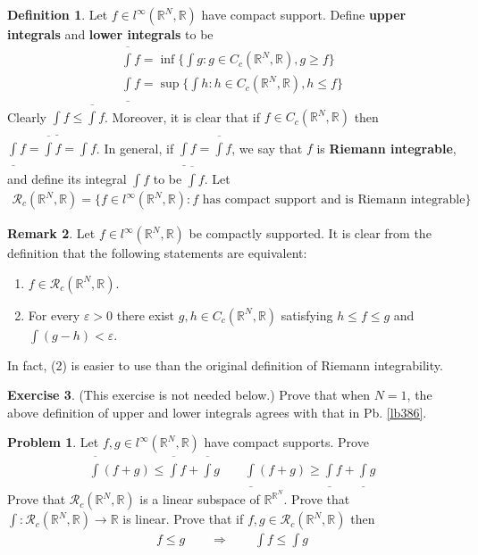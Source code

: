 \documentclass[12pt,b5paper,notitlepage]{article}
\theoremstyle{definition}
\newtheorem{df}{Definition}[section]
\newtheorem{exe}[df]{Exercise}
\newtheorem{rem}[df]{Remark}
\newtheorem{prob}{\color{red}Problem}[section]
\theoremstyle{plain}
\newcommand{\ovl}{\overline}
\newcommand{\udl}{\underline}
\newcommand{\scr}{\mathscr}
\newcommand{\Rbb}{\mathbb R}
\newcommand{\eps}{\varepsilon}
\numberwithin{equation}{section}
\begin{document}
\begin{df}
Let $f\in l^\infty(\Rbb^N,\Rbb)$ have compact support. Define \textbf{upper integrals} and \textbf{lower integrals} to be
\begin{gather*}
\ovl\int f=\inf\Big\{\int g:g\in C_c(\Rbb^N,\Rbb),g\geq f  \Big\}\\
\underline\int f=\sup\Big\{\int h:h\in C_c(\Rbb^N,\Rbb),h\leq f  \Big\}
\end{gather*}
Clearly $\udl\int f\leq\ovl\int f$. Moreover, it is clear that if $f\in C_c(\Rbb^N,\Rbb)$ then $\udl\int f=\ovl\int f=\int f$. In general, if $\udl\int f=\ovl\int f$, we say that $f$ is \textbf{Riemann integrable},  and define its integral $\int f$ to be $\ovl\int f$. Let \index{Rc@$\scr R_c(\Rbb^N,\Rbb)$}
\begin{align*}
\scr R_c(\Rbb^N,\Rbb)=\{f\in l^\infty(\Rbb^N,\Rbb):f\text{ has compact support and is Riemann integrable}\}
\end{align*}
\end{df}

\begin{rem}\label{lb489}
Let $f\in l^\infty(\Rbb^N,\Rbb)$ be compactly supported. It is clear from the definition that the following statements are equivalent:
\begin{enumerate}[label=(\arabic*)]
\item $f\in\scr R_c(\Rbb^N,\Rbb)$.
\item For every $\eps>0$ there exist $g,h\in C_c(\Rbb^N,\Rbb)$ satisfying $h\leq f\leq g$ and $\int(g-h)<\eps$.
\end{enumerate}
In fact, (2) is easier to use than the original definition of Riemann integrability.
\end{rem}


\begin{exe}
(This exercise is not needed below.) Prove that when $N=1$, the above definition of upper and lower integrals agrees with that in Pb. \ref{lb386}. 
\end{exe}


\begin{prob}
Let $f,g\in l^\infty(\Rbb^N,\Rbb)$ have compact supports. Prove
\begin{align*}
\ovl\int(f+g)\leq\ovl\int f+\ovl\int g\qquad \udl\int(f+g)\geq\udl\int f+\udl\int g
\end{align*}
Prove that $\scr R_c(\Rbb^N,\Rbb)$ is a linear subspace of $\Rbb^{\Rbb^N}$. Prove that  $\int:\scr R_c(\Rbb^N,\Rbb)\rightarrow\Rbb$ is linear. Prove that if $f,g\in\scr R_c(\Rbb^N,\Rbb)$ then
\begin{align}
f\leq g\qquad\Longrightarrow\qquad\int f\leq\int g  \label{eq201}
\end{align}
\end{prob}
\end{document}
